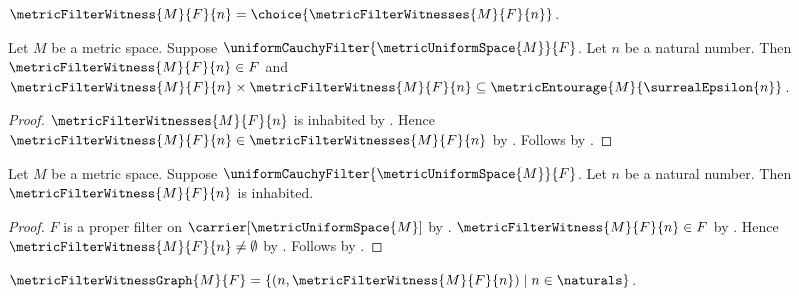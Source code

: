 \begin{definition}\label{metric_filter_witness}
    $\metricFilterWitness{M}{F}{n}=
        \choice{\metricFilterWitnesses{M}{F}{n}}$.
\end{definition}

\begin{proposition}\label{metric_filter_witness_properties}
    Let $M$ be a metric space.
    Suppose $\uniformCauchyFilter{\metricUniformSpace{M}}{F}$.
    Let $n$ be a natural number.
    Then $\metricFilterWitness{M}{F}{n}\in F$ and
        $\metricFilterWitness{M}{F}{n}
            \times\metricFilterWitness{M}{F}{n}
        \subseteq\metricEntourage{M}{\surrealEpsilon{n}}$.
\end{proposition}
\begin{proof}
    $\metricFilterWitnesses{M}{F}{n}$ is inhabited
        by .
    Hence
        $\metricFilterWitness{M}{F}{n}
            \in\metricFilterWitnesses{M}{F}{n}$
        by .
    Follows by .
\end{proof}

\begin{proposition}\label{metric_filter_witness_inhabited}
    Let $M$ be a metric space.
    Suppose $\uniformCauchyFilter{\metricUniformSpace{M}}{F}$.
    Let $n$ be a natural number.
    Then $\metricFilterWitness{M}{F}{n}$ is inhabited.
\end{proposition}
\begin{proof}
    $F$ is a proper filter on $\carrier[\metricUniformSpace{M}]$
        by .
    $\metricFilterWitness{M}{F}{n}\in F$
        by .
    Hence $\metricFilterWitness{M}{F}{n}\neq\emptyset$
        by .
    Follows by .
\end{proof}

\begin{definition}\label{metric_filter_witness_graph}
    $\metricFilterWitnessGraph{M}{F}=
        \{(n,\metricFilterWitness{M}{F}{n})\mid n\in\naturals\}$.
\end{definition}

